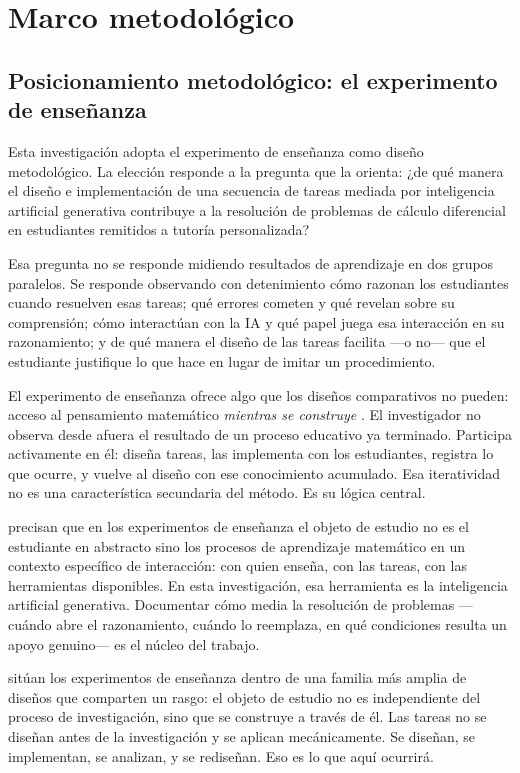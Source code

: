 \chapter{Marco metodológico}
\label{chap:marco_metodologico}

\section{Posicionamiento metodológico: el experimento de enseñanza}

Esta investigación adopta el experimento de enseñanza como diseño metodológico. La elección responde a la pregunta que la orienta: ¿de qué manera el diseño e implementación de una secuencia de tareas mediada por inteligencia artificial generativa contribuye a la resolución de problemas de cálculo diferencial en estudiantes remitidos a tutoría personalizada?

Esa pregunta no se responde midiendo resultados de aprendizaje en dos grupos paralelos. Se responde observando con detenimiento cómo razonan los estudiantes cuando resuelven esas tareas; qué errores cometen y qué revelan sobre su comprensión; cómo interactúan con la IA y qué papel juega esa interacción en su razonamiento; y de qué manera el diseño de las tareas facilita ---o no--- que el estudiante justifique lo que hace en lugar de imitar un procedimiento.

El experimento de enseñanza ofrece algo que los diseños comparativos no pueden: acceso al pensamiento matemático \emph{mientras se construye} \parencite{steffe2000teaching}. El investigador no observa desde afuera el resultado de un proceso educativo ya terminado. Participa activamente en él: diseña tareas, las implementa con los estudiantes, registra lo que ocurre, y vuelve al diseño con ese conocimiento acumulado. Esa iteratividad no es una característica secundaria del método. Es su lógica central.

\textcite{gonzalezAcercamientoInvestigacionDiseno2011} precisan que en los experimentos de enseñanza el objeto de estudio no es el estudiante en abstracto sino los procesos de aprendizaje matemático en un contexto específico de interacción: con quien enseña, con las tareas, con las herramientas disponibles. En esta investigación, esa herramienta es la inteligencia artificial generativa. Documentar cómo media la resolución de problemas ---cuándo abre el razonamiento, cuándo lo reemplaza, en qué condiciones resulta un apoyo genuino--- es el núcleo del trabajo.

\textcite{cobb2003design} sitúan los experimentos de enseñanza dentro de una familia más amplia de diseños que comparten un rasgo: el objeto de estudio no es independiente del proceso de investigación, sino que se construye a través de él. Las tareas no se diseñan antes de la investigación y se aplican mecánicamente. Se diseñan, se implementan, se analizan, y se rediseñan. Eso es lo que aquí ocurrirá.

